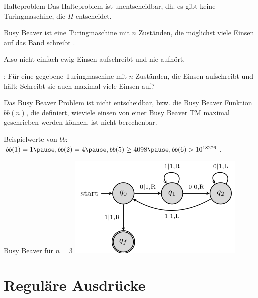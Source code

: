 \documentclass{beamer}
\begin{document}
\begin{frame}{Halteproblem}
	Das Halteproblem ist unentscheidbar\ip, dh. es gibt keine Turingmaschine, die $H$ entscheidet.
\end{frame}

\begin{frame}{Busy Beaver}
	 ist eine Turingmaschine mit $n$ Zuständen, die möglichst viele Einsen auf das Band schreibt .
	
	\begin{itemize}
		\pitem Also nicht einfach ewig Einsen aufschreibt und nie aufhört.
	\end{itemize}
	
	\bp
	
	: Für eine gegebene Turingmaschine mit $n$ Zuständen, die Einsen aufschreibt und hält: Schreibt sie auch maximal viele Einsen auf?
	
	\bp
	\vspace{.2cm}
	
	Das Busy Beaver Problem ist nicht entscheidbar, bzw. die Busy Beaver Funktion $bb(n)$, die definiert, wieviele einsen von einer Busy Beaver TM maximal geschrieben werden können, ist nicht berechenbar.
	
	\bp
	
	\vspace{.2cm}
	
	Beispielwerte von $bb$: $bb(1) = 1\ip, bb(2) = 4\ip, bb(5) \geq 4098\ip, bb(6) > 10^{18276}$.
\end{frame}

\begin{frame}{Busy Beaver für $n = 3$}
	\includegraphics[scale=0.8]{images/turingmaschine_bb.png}	
\end{frame}

\section{Reguläre Ausdrücke}
\end{document}

